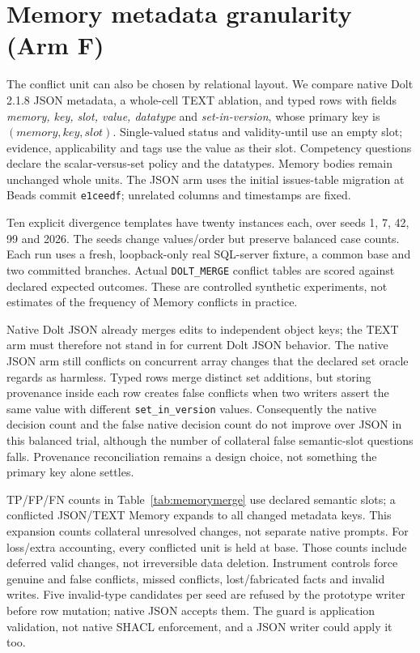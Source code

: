 \section{Memory metadata granularity (Arm F)}
\label{sec:memory}

The conflict unit can also be chosen by relational layout. We compare native
Dolt 2.1.8 JSON metadata, a whole-cell TEXT ablation, and typed rows with fields
\emph{memory, key, slot, value, datatype} and \emph{set-in-version}, whose primary
key is $(memory,key,slot)$. Single-valued status and validity-until use an empty slot;
evidence, applicability and tags use the value as their slot. Competency questions
declare the scalar-versus-set policy and the datatypes. Memory bodies remain
unchanged whole units. The JSON arm uses the initial issues-table migration at
Beads commit \texttt{e1ceedf}; unrelated columns and timestamps are fixed.

Ten explicit divergence templates have twenty instances each, over seeds
1, 7, 42, 99 and 2026. The seeds change values/order but preserve balanced case
counts. Each run uses a fresh, loopback-only real SQL-server fixture, a common
base and two committed branches. Actual \texttt{DOLT\_MERGE} conflict tables are
scored against declared expected outcomes. These are controlled synthetic
experiments, not estimates of the frequency of Memory conflicts in practice.



Native Dolt JSON already merges edits to independent object keys; the TEXT arm
must therefore not stand in for current Dolt JSON behavior. The native JSON arm
still conflicts on concurrent array changes that the declared set oracle regards
as harmless. Typed rows merge distinct set additions, but storing provenance
inside each row creates false conflicts when two writers assert the same value
with different \texttt{set\_in\_version} values. Consequently the native decision
count and the false native decision count do not improve over JSON in this
balanced trial, although the number of collateral false semantic-slot questions
falls. Provenance reconciliation remains a design
choice, not something the primary key alone settles.

TP/FP/FN counts in Table~\ref{tab:memorymerge} use declared semantic slots;
a conflicted JSON/TEXT Memory expands to all changed metadata keys. This
expansion counts collateral unresolved changes, not separate native prompts.
For loss/extra accounting, every conflicted unit is held at base. Those counts
include deferred valid changes, not irreversible data deletion. Instrument
controls force genuine and false conflicts, missed conflicts, lost/fabricated
facts and invalid writes. Five invalid-type candidates per seed are refused by
the prototype writer before row mutation; native JSON accepts them. The guard
is application validation, not native SHACL enforcement, and a JSON writer could
apply it too.

